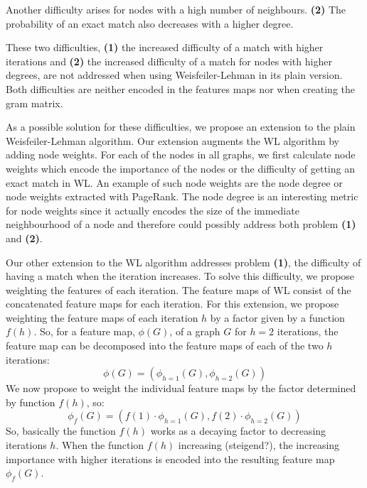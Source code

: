 Another difficulty arises for nodes with a high number of neighbours. \textbf{(2)} The probability of an exact match also decreases with a higher degree.

These two difficulties, \textbf{(1)} the increased difficulty of a match with higher iterations and \textbf{(2)} the increased difficulty of a match for nodes with higher degrees, are not addressed when using Weisfeiler-Lehman in its plain version. Both difficulties are neither encoded in the features maps nor when creating the gram matrix.

As a possible solution for these difficulties, we propose an extension to the plain Weisfeiler-Lehman algorithm.
Our extension augments the WL algorithm by adding node weights.
For each of the nodes in all graphs, we first calculate node weights which encode the importance of the nodes or the difficulty of getting an exact match in WL.
An example of such node weights are the node degree or node weights extracted with PageRank.
The node degree is an interesting metric for node weights since it actually encodes the size of the immediate neighbourhood of a node and therefore could possibly address both problem \textbf{(1)} and \textbf{(2)}.


Our other extension to the WL algorithm addresses problem \textbf{(1)}, the difficulty of having a match when the iteration increases.
To solve this difficulty, we propose weighting the features of each iteration.
The feature maps of WL consist of the concatenated feature maps for each iteration.
For this extension, we propose weighting the feature maps of each iteration $h$ by a factor given by a function $f(h)$.
So, for a feature map, $\phi(G)$, of a graph $G$ for $h=2$ iterations, the feature map can be decomposed into the feature maps of each of the two $h$ iterations:
\begin{equation*}
\phi(G)=(\phi_{h=1}(G), \phi_{h=2}(G))
\end{equation*}
We now propose to weight the individual feature maps by the factor determined by function $f(h)$, so:
\begin{equation*}
\phi_{f}(G)=(f(1) \cdot \phi_{h=1}(G), f(2) \cdot \phi_{h=2}(G))
\end{equation*}
So, basically the function $f(h)$ works as a decaying factor to decreasing iterations $h$.
When the function $f(h)$ increasing (steigend?), the increasing importance with higher iterations is encoded into the resulting feature map $\phi_f(G)$.

